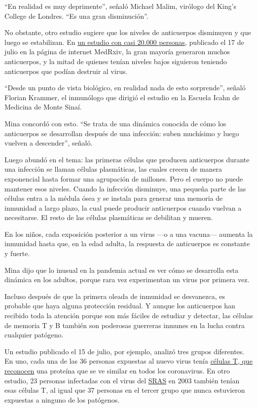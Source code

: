 ``En realidad es muy deprimente'', señaló Michael Malim, virólogo del
King's College de Londres. ``Es una gran disminución''.

No obstante, otro estudio sugiere que los niveles de anticuerpos
disminuyen y que luego se estabilizan. En
\href{https://www.medrxiv.org/content/10.1101/2020.07.14.20151126v1}{un
estudio con casi 20.000 personas}, publicado el 17 de julio en la página
de internet MedRxiv, la gran mayoría generaron muchos anticuerpos, y la
mitad de quienes tenían niveles bajos siguieron teniendo anticuerpos que
podían destruir al virus.

``Desde un punto de vista biológico, en realidad nada de esto
sorprende'', señaló Florian Krammer, el inmunólogo que dirigió el
estudio en la Escuela Icahn de Medicina de Monte Sinaí.

Mina concordó con esto. ``Se trata de una dinámica conocida de cómo los
anticuerpos se desarrollan después de una infección: suben muchísimo y
luego vuelven a descender'', señaló.

Luego abundó en el tema: las primeras células que producen anticuerpos
durante una infección se llaman células plasmáticas, las cuales crecen
de manera exponencial hasta formar una agrupación de millones. Pero el
cuerpo no puede mantener esos niveles. Cuando la infección disminuye,
una pequeña parte de las células entra a la médula ósea y se instala
para generar una memoria de inmunidad a largo plazo, la cual puede
producir anticuerpos cuando vuelvan a necesitarse. El resto de las
células plasmáticas se debilitan y mueren.

En los niños, cada exposición posterior a un virus ---o a una vacuna---
aumenta la inmunidad hasta que, en la edad adulta, la respuesta de
anticuerpos es constante y fuerte.

Mina dijo que lo inusual en la pandemia actual es ver cómo se desarrolla
esta dinámica en los adultos, porque rara vez experimentan un virus por
primera vez.

Incluso después de que la primera oleada de inmunidad se desvanezca, es
probable que haya alguna protección residual. Y aunque los anticuerpos
han recibido toda la atención porque son más fáciles de estudiar y
detectar, las células de memoria T y B también son poderosas guerreras
inmunes en la lucha contra cualquier patógeno.

Un estudio publicado el 15 de julio, por ejemplo, analizó tres grupos
diferentes. En uno, cada una de las 36 personas expuestas al nuevo virus
tenía \href{https://www.nature.com/articles/s41586-020-2550-z}{células
T, que reconocen} una proteína que se ve similar en todos los
coronavirus. En otro estudio, 23 personas infectadas con el virus del
\href{https://www.cdc.gov/sars/about/fs-sars-sp.html}{SRAS} en 2003
también tenían esas células T, al igual que 37 personas en el tercer
grupo que nunca estuvieron expuestas a ninguno de los patógenos.

